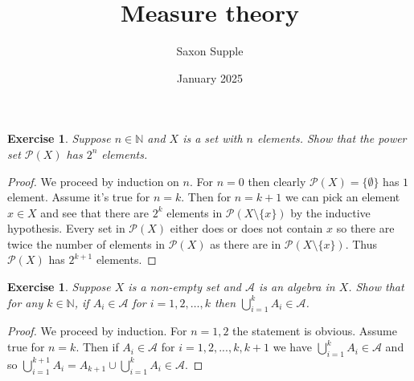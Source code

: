 \documentclass{article}
\title{Measure theory}
\author{Saxon Supple}
\date{January 2025}
\newtheorem{exercise}[theorem]{Exercise}
\begin{document}
\maketitle

\begin{exercise}
Suppose $n \in \mathbb{N}$ and $X$ is a set with $n$ elements. Show that the power set $\mathcal{P}(X)$ has $2^n$ elements.
\end{exercise}
\begin{proof}
We proceed by induction on $n$. For $n=0$ then clearly $\mathcal{P}(X)=\{\emptyset\}$ has $1$ element. Assume it's true for $n=k$. Then for $n=k+1$ we can pick an element $x\in X$ and see that there are $2^k$ elements in $\mathcal{P}(X\setminus\{x\})$ by the inductive hypothesis. Every set in $\mathcal{P}(X)$ either does or does not contain $x$ so there are twice the number of elements in $\mathcal{P}(X)$ as there are in $\mathcal{P}(X\setminus\{x\})$. Thus $\mathcal{P}(X)$ has $2^{k+1}$ elements.
\end{proof}

\begin{exercise}
    Suppose $X$ is a non-empty set and $\mathcal{A}$ is an algebra in $X$. Show that for any $k \in \mathbb{N}$, if $A_i \in \mathcal{A}$ for $i = 1, 2, \ldots, k$ then $\bigcup_{i=1}^k A_i \in \mathcal{A}$.
\end{exercise}
\begin{proof}
We proceed by induction. For $n=1,2$ the statement is obvious. Assume true for $n=k$. Then if $A_i\in\mathcal{A}$ for $i=1,2,...,k,k+1$ we have $\bigcup_{i=1}^kA_i\in\mathcal{A}$ and so $\bigcup_{i=1}^{k+1}A_i=A_{k+1}\cup\bigcup_{i=1}^kA_i\in\mathcal{A}$. 
\end{proof}
\end{document}
